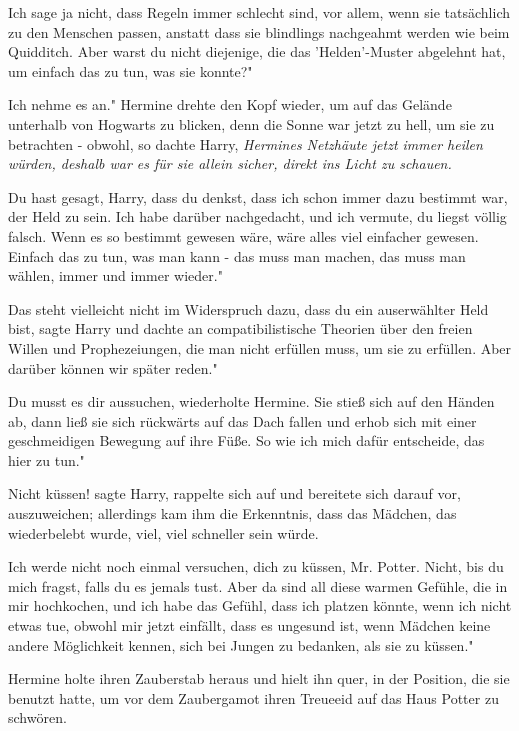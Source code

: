 \glqq Ich sage ja nicht, dass Regeln immer schlecht sind, vor allem, wenn sie
tatsächlich zu den Menschen passen, anstatt dass sie blindlings nachgeahmt
werden wie beim Quidditch. Aber warst du nicht diejenige, die das
'Helden'-Muster abgelehnt hat, um einfach das zu tun, was sie konnte?"

\glqq Ich nehme es an." Hermine drehte den Kopf wieder, um auf das Gelände
unterhalb von Hogwarts zu blicken, denn die Sonne war jetzt zu hell, um sie zu
betrachten - obwohl, so dachte Harry, \emph{Hermines Netzhäute jetzt immer
heilen würden, deshalb war es für sie allein sicher, direkt ins Licht zu
schauen.}

\glqq Du hast gesagt, Harry, dass du denkst, dass ich schon immer dazu bestimmt
war, der Held zu sein. Ich habe darüber nachgedacht, und ich vermute, du liegst
völlig falsch. Wenn es so bestimmt gewesen wäre, wäre alles viel einfacher
gewesen. Einfach das zu tun, was man kann - das muss man machen, das muss man
wählen, immer und immer wieder."

\glqq Das steht vielleicht nicht im Widerspruch dazu, dass du ein auserwählter
Held bist\grqq{}, sagte Harry und dachte an compatibilistische Theorien über den
freien Willen und Prophezeiungen, die man nicht erfüllen muss, um sie zu
erfüllen. \glqq Aber darüber können wir später reden."

\glqq Du musst es dir aussuchen\grqq{}, wiederholte Hermine. Sie stieß sich auf
den Händen ab, dann ließ sie sich rückwärts auf das Dach fallen und erhob sich
mit einer geschmeidigen Bewegung auf ihre Füße. \glqq So wie ich mich dafür
entscheide, das hier zu tun."

\glqq Nicht küssen!\grqq{} sagte Harry, rappelte sich auf und bereitete sich
darauf vor, auszuweichen; allerdings kam ihm die Erkenntnis, dass das Mädchen,
das wiederbelebt wurde, viel, viel schneller sein würde.

\glqq Ich werde nicht noch einmal versuchen, dich zu küssen, Mr. Potter. Nicht,
bis du mich fragst, falls du es jemals tust. Aber da sind all diese warmen
Gefühle, die in mir hochkochen, und ich habe das Gefühl, dass ich platzen
könnte, wenn ich nicht etwas tue, obwohl mir jetzt einfällt, dass es ungesund
ist, wenn Mädchen keine andere Möglichkeit kennen, sich bei Jungen zu bedanken,
als sie zu küssen."

Hermine holte ihren Zauberstab heraus und hielt ihn quer, in der Position, die
sie benutzt hatte, um vor dem Zaubergamot ihren Treueeid auf das Haus Potter zu
schwören.

